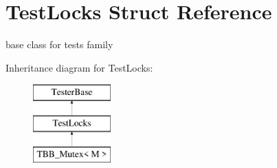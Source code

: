 \hypertarget{structTestLocks}{}\section{Test\+Locks Struct Reference}
\label{structTestLocks}


base class for tests family  


Inheritance diagram for Test\+Locks\+:\begin{figure}[H]
\begin{center}
\leavevmode
\includegraphics[height=3.000000cm]{structTestLocks}
\end{center}
\end{figure}
